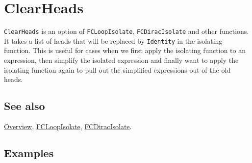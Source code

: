 \documentclass[../FeynCalcManual.tex]{subfiles}
\begin{document}
\hypertarget{clearheads}{
\section{ClearHeads}\label{clearheads}}

\texttt{ClearHeads} is an option of \texttt{FCLoopIsolate},
\texttt{FCDiracIsolate} and other functions. It takes a list of heads
that will be replaced by \texttt{Identity} in the isolating function.
This is useful for cases when we first apply the isolating function to
an expression, then simplify the isolated expression and finally want to
apply the isolating function again to pull out the simplified
expressions out of the old heads.

\subsection{See also}

\hyperlink{toc}{Overview}, \hyperlink{fcloopisolate}{FCLoopIsolate},
\hyperlink{fcdiracisolate}{FCDiracIsolate}.

\subsection{Examples}
\end{document}
